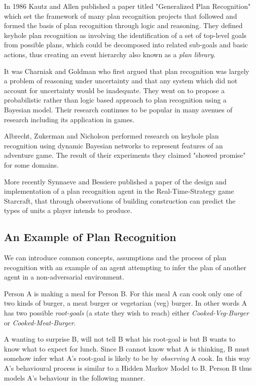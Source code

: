 \documentclass[parskip]{cs4rep}
\begin{document}
In 1986 Kautz and Allen published a paper titled "Generalized Plan Recognition" \cite{conf/aaai/KautzA86} which set the framework of many plan recognition projects that followed and formed the basis of plan recognition through logic and reasoning. They defined keyhole plan recognition as involving the identification of a set of top-level goals from possible plans, which could be decomposed into related sub-goals and basic actions, thus creating an event hierarchy also known as a \textit{plan library}. 

It was Charniak and Goldman \cite{journals/ai/CharniakG93} who first argued that plan recognition was largely a problem of reasoning under uncertainty and that any system which did not account for uncertainty would be inadequate. They went on to propose a probabilistic rather than logic based approach to  plan recognition using a Bayesian model. Their research continues to be popular in many avenues of research including its application in games.

Albrecht, Zukerman and Nicholson \cite{Albrecht:1998:BMK:598277.598308} performed research on keyhole plan recognition using dynamic Bayesian networks to represent features of an adventure game. The result of their experiments they claimed "showed promise" for some domains. 

More recently Synnaeve and Bessiere \cite{conf/aiide/SynnaeveB11} published a paper of the design and implementation of a plan recognition agent in the Real-Time-Strategy game Starcraft, that through observations of building construction can predict the types of units a player intends to produce.

\subsection{An Example of Plan Recognition}

We can introduce common concepts, assumptions and the process of plan recognition with an example of an agent attempting to infer the plan of another agent in a non-adversarial environment. 

Person A is making a meal for Person B. For this meal A can cook only one of two kinds of burger, a meat burger or vegetarian (veg) burger. In other words A has two possible \textit{root-goals} (a state they wish to reach) either \textit{Cooked-Veg-Burger} or \textit{Cooked-Meat-Burger}. 

A wanting to surprise B, will not tell B what his root-goal is but B wants to know what to expect for lunch. Since B cannot know what A is thinking, B must somehow infer what A's root-goal is likely to be by \textit{observing} A cook. In this way A's behavioural process is similar to a Hidden Markov Model to B. Person B thus models A's behaviour in the following manner. 
\end{document}
